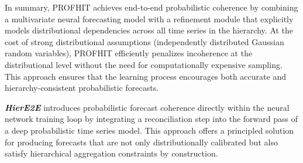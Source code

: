\documentclass[letterpaper]{article}
\begin{document}
In summary, PROFHIT achieves end-to-end probabilistic coherence by combining a multivariate neural forecasting model with a refinement module that explicitly models distributional dependencies across all time series in the hierarchy. At the cost of strong distributional assumptions (independently distributed Gaussian random variables), PROFHIT efficiently penalizes incoherence at the distributional level without the need for computationally expensive sampling. This approach ensures that the learning process encourages both accurate and hierarchy-consistent probabilistic forecasts.

\textit{\textbf{HierE2E}} introduces probabilistic forecast coherence directly within the neural network training loop by integrating a reconciliation step into the forward pass of a deep probabilistic time series model. This approach offers a principled solution for producing forecasts that are not only distributionally calibrated but also satisfy hierarchical aggregation constraints by construction.
\end{document}
